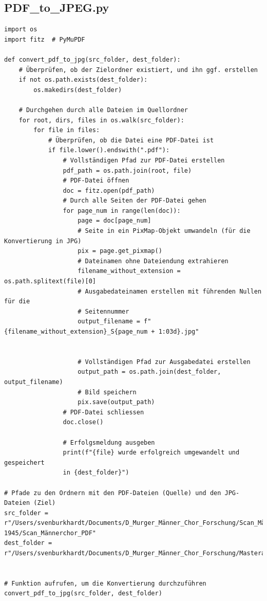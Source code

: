 \documentclass[12pt, a4paper, ngerman, bidi=default]{article}
\begin{document}
\subsection{PDF\_to\_JPEG.py}\label{section:PDF_to_JPEG}
\begin{verbatim}
import os
import fitz  # PyMuPDF

def convert_pdf_to_jpg(src_folder, dest_folder):
    # Überprüfen, ob der Zielordner existiert, und ihn ggf. erstellen
    if not os.path.exists(dest_folder):
        os.makedirs(dest_folder)

    # Durchgehen durch alle Dateien im Quellordner
    for root, dirs, files in os.walk(src_folder):
        for file in files:
            # Überprüfen, ob die Datei eine PDF-Datei ist
            if file.lower().endswith(".pdf"):
                # Vollständigen Pfad zur PDF-Datei erstellen
                pdf_path = os.path.join(root, file)
                # PDF-Datei öffnen
                doc = fitz.open(pdf_path)
                # Durch alle Seiten der PDF-Datei gehen
                for page_num in range(len(doc)):
                    page = doc[page_num]
                    # Seite in ein PixMap-Objekt umwandeln (für die Konvertierung in JPG)
                    pix = page.get_pixmap()
                    # Dateinamen ohne Dateiendung extrahieren
                    filename_without_extension = os.path.splitext(file)[0]
                    # Ausgabedateinamen erstellen mit führenden Nullen für die 
                    # Seitennummer
                    output_filename = f"{filename_without_extension}_S{page_num + 1:03d}.jpg"


                    # Vollständigen Pfad zur Ausgabedatei erstellen
                    output_path = os.path.join(dest_folder, output_filename)
                    # Bild speichern
                    pix.save(output_path)
                # PDF-Datei schliessen
                doc.close()
                
                # Erfolgsmeldung ausgeben
                print(f"{file} wurde erfolgreich umgewandelt und gespeichert
                in {dest_folder}")

# Pfade zu den Ordnern mit den PDF-Dateien (Quelle) und den JPG-Dateien (Ziel)
src_folder = r"/Users/svenburkhardt/Documents/D_Murger_Männer_Chor_Forschung/Scan_Männerchor/Männerchor_Akten_1925–1945/Scan_Männerchor_PDF"
dest_folder = r"/Users/svenburkhardt/Documents/D_Murger_Männer_Chor_Forschung/Masterarbeit/JPEG_Akten_Scans"


# Funktion aufrufen, um die Konvertierung durchzuführen
convert_pdf_to_jpg(src_folder, dest_folder)

\end{verbatim}
\end{document}
